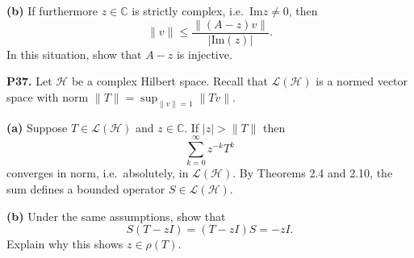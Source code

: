 \documentclass[12pt]{amsart}
\newcommand{\cH}{\mathcal{H}}
\newcommand{\cL}{\mathcal{L}}
\newcommand{\CC}{\mathbb{C}}
\renewcommand{\Im}{\mathrm{Im}}
\newcommand{\prob}[1]{\bigskip\noindent\textbf{#1.}\quad }
\newcommand{\epart}[1]{\medskip\noindent\textbf{(#1)}\quad }
\begin{document}
\epart{b}  If furthermore $z\in\CC$ is strictly complex, i.e.~$\Im z \ne 0$, then
	$$\|v\| \le \frac{\|(A-z)v\|}{|\Im(z)|}.$$
In this situation, show that $A-z$ is injective.


\prob{P37}  Let $\cH$ be a complex Hilbert space.  Recall that $\cL(\cH)$ is a normed vector space with norm $\|T\| = \sup_{\|v\|=1} \|Tv\|$.

\epart{a}  Suppose $T\in\cL(\cH)$ and $z\in\CC$.  If $|z| > \|T\|$ then
	$$\sum_{k=0}^\infty z^{-k} T^k$$
converges in norm, i.e.~absolutely, in $\cL(\cH)$.  By Theorems 2.4 and 2.10, the sum defines a bounded operator $S \in \cL(\cH)$.

\epart{b}  Under the same assumptions, show that
	$$S (T-z I) = (T-z I) S = - z I.$$
Explain why this shows $z \in \rho(T)$.



\end{document}
